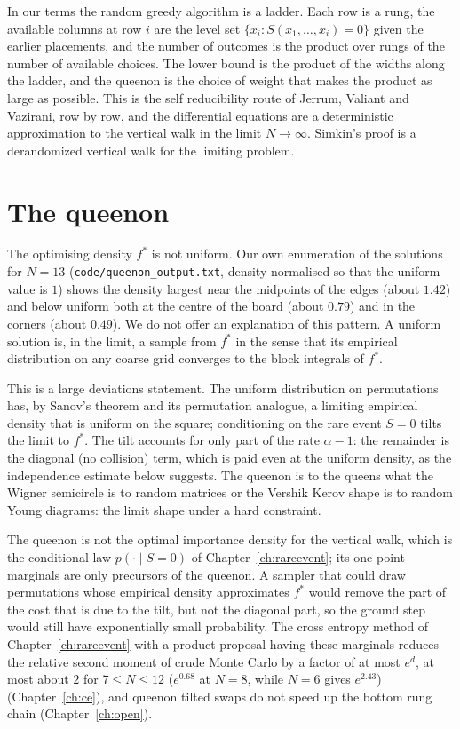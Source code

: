 In our terms the random greedy algorithm is a ladder. Each row is a rung, the available columns at row $i$ are the level set $\{ x_i : S(x_1, \dots, x_i) = 0 \}$ given the earlier placements, and the number of outcomes is the product over rungs of the number of available choices. The lower bound is the product of the widths along the ladder, and the queenon is the choice of weight that makes the product as large as possible. This is the self reducibility route of Jerrum, Valiant and Vazirani, row by row, and the differential equations are a deterministic approximation to the vertical walk in the limit $N \to \infty$. Simkin's proof is a derandomized vertical walk for the limiting problem.

\section{The queenon}

The optimising density $f^*$ is not uniform. Our own enumeration of the solutions for $N = 13$ (\texttt{code/queenon\_output.txt}, density normalised so that the uniform value is $1$) shows the density largest near the midpoints of the edges (about $1.42$) and below uniform both at the centre of the board (about $0.79$) and in the corners (about $0.49$). We do not offer an explanation of this pattern. A uniform solution is, in the limit, a sample from $f^*$ in the sense that its empirical distribution on any coarse grid converges to the block integrals of $f^*$.

This is a large deviations statement. The uniform distribution on permutations has, by Sanov's theorem and its permutation analogue, a limiting empirical density that is uniform on the square; conditioning on the rare event $S = 0$ tilts the limit to $f^*$. The tilt accounts for only part of the rate $\alpha - 1$: the remainder is the diagonal (no collision) term, which is paid even at the uniform density, as the independence estimate below suggests. The queenon is to the queens what the Wigner semicircle is to random matrices or the Vershik Kerov shape is to random Young diagrams: the limit shape under a hard constraint.

The queenon is not the optimal importance density for the vertical walk, which is the conditional law $p(\cdot \mid S = 0)$ of Chapter~\ref{ch:rareevent}; its one point marginals are only precursors of the queenon. A sampler that could draw permutations whose empirical density approximates $f^*$ would remove the part of the cost that is due to the tilt, but not the diagonal part, so the ground step would still have exponentially small probability. The cross entropy method of Chapter~\ref{ch:rareevent} with a product proposal having these marginals reduces the relative second moment of crude Monte Carlo by a factor of at most $e^{d}$, at most about $2$ for $7 \le N \le 12$ ($e^{0.68}$ at $N = 8$, while $N = 6$ gives $e^{2.43}$) (Chapter~\ref{ch:ce}), and queenon tilted swaps do not speed up the bottom rung chain (Chapter~\ref{ch:open}).

